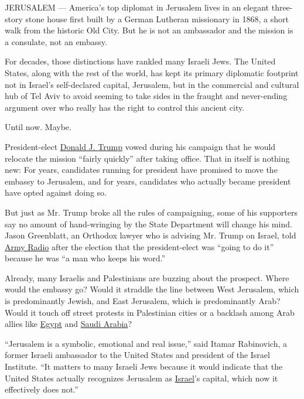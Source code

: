 JERUSALEM --- America's top diplomat in Jerusalem lives in an elegant
three-story stone house first built by a German Lutheran missionary in
1868, a short walk from the historic Old City. But he is not an
ambassador and the mission is a consulate, not an embassy.

For decades, those distinctions have rankled many Israeli Jews. The
United States, along with the rest of the world, has kept its primary
diplomatic footprint not in Israel's self-declared capital, Jerusalem,
but in the commercial and cultural hub of Tel Aviv to avoid seeming to
take sides in the fraught and never-ending argument over who really has
the right to control this ancient city.

Until now. Maybe.

President-elect
\href{http://www.nytimes3xbfgragh.onion/topic/person/donald-trump}{Donald
J. Trump} vowed during his campaign that he would relocate the mission
``fairly quickly'' after taking office. That in itself is nothing new:
For years, candidates running for president have promised to move the
embassy to Jerusalem, and for years, candidates who actually became
president have opted against doing so.

But just as Mr. Trump broke all the rules of campaigning, some of his
supporters say no amount of hand-wringing by the State Department will
change his mind. Jason Greenblatt, an Orthodox lawyer who is advising
Mr. Trump on Israel, told
\href{http://www.timesofisrael.com/trump-adviser-he-doesnt-see-settlements-as-peace-obstacle/}{Army
Radio} after the election that the president-elect was ``going to do
it'' because he was ``a man who keeps his word.''

Already, many Israelis and Palestinians are buzzing about the prospect.
Where would the embassy go? Would it straddle the line between West
Jerusalem, which is predominantly Jewish, and East Jerusalem, which is
predominantly Arab? Would it touch off street protests in Palestinian
cities or a backlash among Arab allies like
\href{http://www.nytimes3xbfgragh.onion/topic/destination/egypt}{Egypt}
and
\href{http://www.nytimes3xbfgragh.onion/topic/destination/saudi-arabia}{Saudi
Arabia}?

``Jerusalem is a symbolic, emotional and real issue,'' said Itamar
Rabinovich, a former Israeli ambassador to the United States and
president of the Israel Institute. ``It matters to many Israeli Jews
because it would indicate that the United States actually recognizes
Jerusalem as
\href{http://www.nytimes3xbfgragh.onion/topic/destination/israel?inline=nyt-geo}{Israel}'s
capital, which now it effectively does not.''

